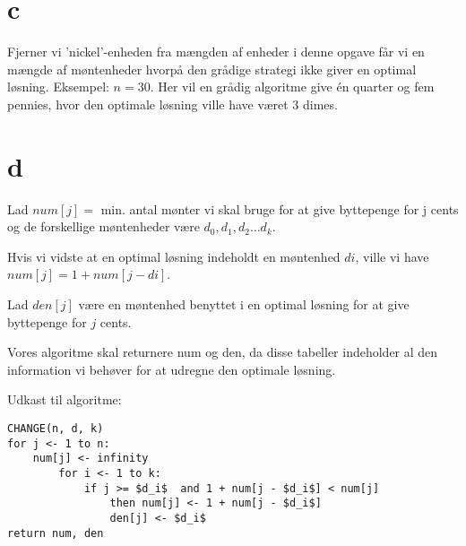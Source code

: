 \documentclass[10pt,a4paper,danish]{article}
\begin{document}
\section{c}
Fjerner vi 'nickel'-enheden fra mængden af enheder i denne opgave får vi en mængde af møntenheder
hvorpå den grådige strategi ikke giver en optimal løsning. Eksempel: $n = 30$. Her vil en grådig
algoritme give én quarter og fem pennies, hvor den optimale løsning ville have været 3 dimes. 

\section{d}
Lad $num[j] =$ min. antal mønter vi skal bruge for at give byttepenge for j cents og de forskellige 
møntenheder være $d_0, d_1, d_2 \ldots d_k$. 

Hvis vi vidste at en optimal løsning indeholdt en møntenhed $di$, ville vi have 
$num[j] = 1 + num[j - di]$. 

Lad $den[j]$ være en møntenhed benyttet i en optimal løsning for at give byttepenge for $j$ cents. 

Vores algoritme skal returnere num og den, da disse tabeller indeholder al den information vi 
behøver for at udregne den optimale løsning. 

Udkast til algoritme: 
\begin{verbatim}
CHANGE(n, d, k)
for j <- 1 to n: 
    num[j] <- infinity
        for i <- 1 to k: 
            if j >= $d_i$  and 1 + num[j - $d_i$] < num[j]
                then num[j] <- 1 + num[j - $d_i$]
                den[j] <- $d_i$ 
return num, den
\end{verbatim}











 





 
\end{document}
